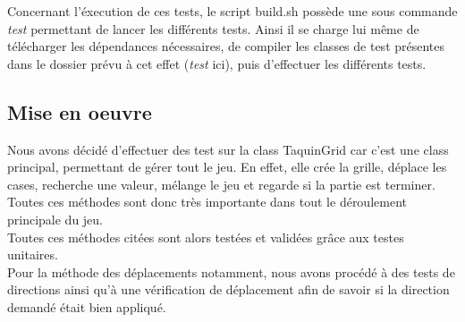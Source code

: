 			Concernant l'éxecution de ces tests, le script build.sh possède une sous commande \textit{test} permettant de lancer les différents tests. Ainsi il se charge lui même de télécharger les dépendances nécessaires, de compiler les classes de test présentes dans le dossier prévu à cet effet (\textit{test} ici), puis d'effectuer les différents tests.

		\subsection{Mise en oeuvre}

			Nous avons décidé d'effectuer des test sur la class TaquinGrid car c'est une class principal, permettant de gérer tout le jeu. En effet, elle crée la grille, déplace les cases, recherche une valeur, mélange le jeu et regarde si la partie est terminer. Toutes ces méthodes sont donc très importante dans tout le déroulement principale du jeu.\\
			Toutes ces méthodes citées sont alors testées et validées grâce aux testes unitaires.\\
			Pour la méthode des déplacements notamment, nous avons procédé à des tests de directions ainsi qu'à une vérification de déplacement afin de savoir si la direction demandé était bien appliqué.

